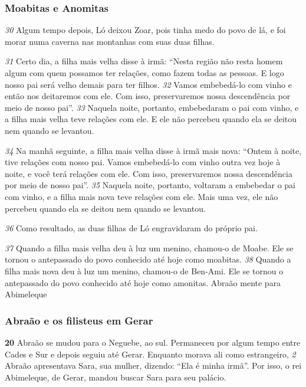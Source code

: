 \bigskip   
\subsubsection*{Moabitas e Anomitas}
\textit{\tiny 30}
Algum tempo depois, Ló deixou Zoar, pois tinha medo do povo de lá, e foi morar
numa caverna nas montanhas com suas duas filhas. 

\bigskip   
\textit{\tiny 31}
Certo dia, a filha mais velha
disse à irmã: “Nesta região não resta homem algum com quem possamos ter
relações, como fazem todas as pessoas. E logo nosso pai será velho demais para
ter filhos. 
\textit{\tiny 32}
Vamos embebedá-lo com vinho e então nos deitaremos com ele. Com
isso, preservaremos nossa descendência por meio de nosso pai”.
\textit{\tiny 33}
Naquela noite, portanto, embebedaram o pai com vinho, e a filha mais velha
teve relações com ele. E ele não percebeu quando ela se deitou nem quando se
levantou.

\bigskip   
\textit{\tiny 34}
Na manhã seguinte, a filha mais velha disse à irmã mais nova: “Ontem à noite,
tive relações com nosso pai. Vamos embebedá-lo com vinho outra vez hoje à
noite, e você terá relações com ele. Com isso, preservaremos nossa descendência
por meio de nosso pai”.
\textit{\tiny 35}
Naquela noite, portanto, voltaram a embebedar o pai com vinho, e a filha
mais nova teve relações com ele. Mais uma vez, ele não percebeu quando ela se
deitou nem quando se levantou.

\bigskip   
\textit{\tiny 36}
Como resultado, as duas filhas de Ló engravidaram do próprio pai. 

\bigskip   
\textit{\tiny 37}
Quando
a filha mais velha deu à luz um menino, chamou-o de Moabe. Ele se tornou o
antepassado do povo conhecido até hoje como moabitas. 
\textit{\tiny 38}
Quando a filha mais
nova deu à luz um menino, chamou-o de Ben-Ami. Ele se tornou o antepassado
do povo conhecido até hoje como amonitas.
Abraão mente para Abimeleque
   
\bigskip   
\subsubsection*{Abraão e os filisteus em Gerar}
\textbf{\large 20}
 Abraão se mudou para o Neguebe, ao sul. Permaneceu por algum tempo
entre Cades e Sur e depois seguiu até Gerar. Enquanto morava ali como
estrangeiro, 
\textit{\tiny 2}
Abraão apresentava Sara, sua mulher, dizendo: “Ela é minha irmã”.
Por isso, o rei Abimeleque, de Gerar, mandou buscar Sara para seu palácio.

